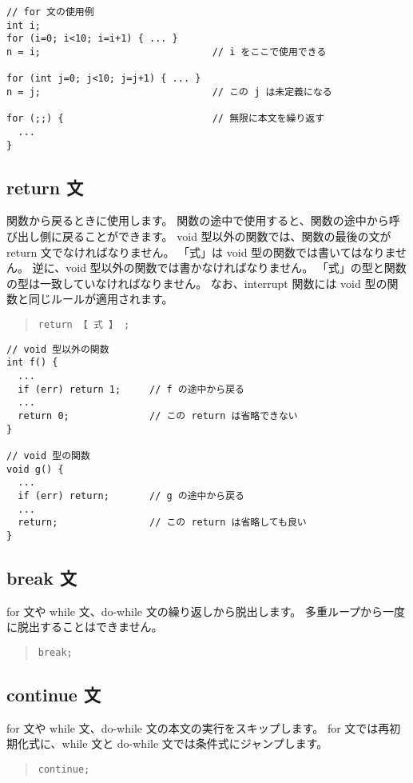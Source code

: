 \begin{mylist}
\begin{verbatim}
// for 文の使用例
int i;
for (i=0; i<10; i=i+1) { ... }
n = i;                              // i をここで使用できる

for (int j=0; j<10; j=j+1) { ... }
n = j;                              // この j は未定義になる

for (;;) {                          // 無限に本文を繰り返す
  ...
}
\end{verbatim}
\end{mylist}

\subsection{return 文}

関数から戻るときに使用します。
関数の途中で使用すると、関数の途中から呼び出し側に戻ることができます。
void 型以外の関数では、関数の最後の文が return 文でなければなりません。
「式」は void 型の関数では書いてはなりません。
逆に、void 型以外の関数では書かなければなりません。
「式」の型と関数の型は一致していなければなりません。
なお、interrupt 関数には void 型の関数と同じルールが適用されます。

\begin{quote}
\begin{verbatim}
return 【 式 】 ;
\end{verbatim}
\end{quote}

\begin{mylist}
\begin{verbatim}
// void 型以外の関数
int f() {
  ...
  if (err) return 1;     // f の途中から戻る
  ...
  return 0;              // この return は省略できない
}

// void 型の関数
void g() {
  ...
  if (err) return;       // g の途中から戻る
  ...
  return;                // この return は省略しても良い
}
\end{verbatim}
\end{mylist}

\subsection{break 文}

for 文や while 文、do-while 文の繰り返しから脱出します。
多重ループから一度に脱出することはできません。

\begin{quote}
\begin{verbatim}
break;
\end{verbatim}
\end{quote}

\subsection{continue 文}

for 文や while 文、do-while 文の本文の実行をスキップします。
for 文では再初期化式に、while 文と do-while 文では条件式にジャンプします。

\begin{quote}
\begin{verbatim}
continue;
\end{verbatim}
\end{quote}
